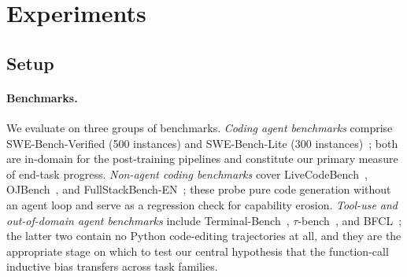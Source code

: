 
\section{Experiments}
\label{sec:exp}

\subsection{Setup}
\label{sec:exp:setup}

\paragraph{Benchmarks.}
We evaluate on three groups of benchmarks. \emph{Coding agent benchmarks}
comprise SWE-Bench-Verified (500 instances) and SWE-Bench-Lite
(300 instances)~\citep{swebench}; both are in-domain for the
post-training pipelines and constitute our primary measure of end-task
progress. \emph{Non-agent coding benchmarks} cover
LiveCodeBench~\citep{livecodebench}, OJBench~\citep{ojbench}, and
FullStackBench-EN~\citep{fullstackbench}; these probe pure code generation
without an agent loop and serve as a regression check for capability
erosion. \emph{Tool-use and out-of-domain agent benchmarks} include
Terminal-Bench~\citep{terminalbench}, $\tau$-bench~\citep{taubench}, and
BFCL~\citep{bfcl}; the latter two contain no Python code-editing
trajectories at all, and they are the appropriate stage on which to test
our central hypothesis that the function-call inductive bias transfers
across task families.

